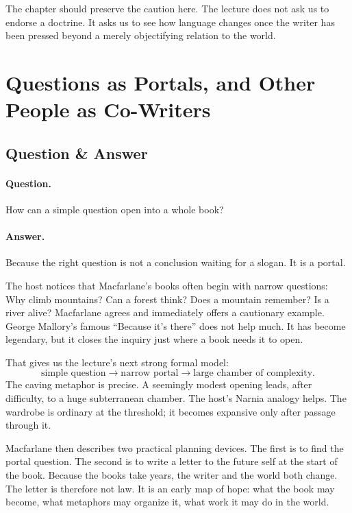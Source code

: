 The chapter should preserve the caution here. The lecture does not ask us to endorse a doctrine. It asks us to see how language changes once the writer has been pressed beyond a merely objectifying relation to the world.

\section{Questions as Portals, and Other People as Co-Writers}

\subsection{Question \& Answer}

\paragraph{Question.} How can a simple question open into a whole book?

\paragraph{Answer.} Because the right question is not a conclusion waiting for a slogan. It is a portal.

The host notices that Macfarlane's books often begin with narrow questions: Why climb mountains? Can a forest think? Does a mountain remember? Is a river alive? Macfarlane agrees and immediately offers a cautionary example. George Mallory's famous ``Because it's there'' does not help much. It has become legendary, but it closes the inquiry just where a book needs it to open.

That gives us the lecture's next strong formal model:
\begin{equation}
\text{simple question} \longrightarrow \text{narrow portal} \longrightarrow \text{large chamber of complexity}.
\end{equation}
The caving metaphor is precise. A seemingly modest opening leads, after difficulty, to a huge subterranean chamber. The host's Narnia analogy helps. The wardrobe is ordinary at the threshold; it becomes expansive only after passage through it.

Macfarlane then describes two practical planning devices. The first is to find the portal question. The second is to write a letter to the future self at the start of the book. Because the books take years, the writer and the world both change. The letter is therefore not law. It is an early map of hope: what the book may become, what metaphors may organize it, what work it may do in the world.


